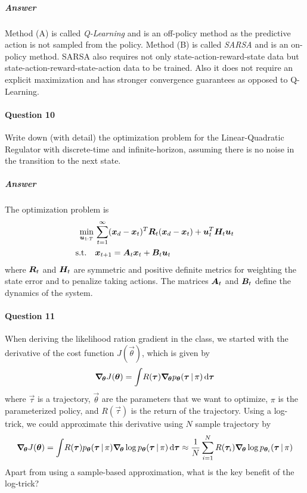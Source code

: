 		\subparagraph{Answer}
			Method (A) is called \emph{Q-Learning} and is an off-policy method as the predictive action is not sampled from the policy. Method (B) is called \emph{SARSA} and is an on-policy method. SARSA also requires not only state-action-reward-state data but state-action-reward-state-action data to be trained. Also it does not require an explicit maximization and has stronger convergence guarantees as opposed to Q-Learning.

	\paragraph{Question 10}
		Write down (with detail) the optimization problem for the Linear-Quadratic Regulator with discrete-time and infinite-horizon, assuming there is no noise in the transition to the next state.

		\subparagraph{Answer}
			The optimization problem is
			\begin{equation*}
				\begin{aligned}
					\min_{\bm{u}_{1:T}} \,& \sum_{t = 1}^{\infty} (\bm{x}_d - \bm{x}_t)^T \bm{R}_t (\bm{x}_d - \bm{x}_t) + \bm{u}_t^T \bm{H}_t \bm{u}_t \\
					\mathrm{s.t.} \quad&
						\begin{aligned}
							\bm{x}_{t + 1} &= \bm{A}_t \bm{x}_t + \bm{B}_t \bm{u}_t
						\end{aligned}
				\end{aligned}
			\end{equation*}
			where \(\bm{R}_t\) and \(\bm{H}_t\) are symmetric and positive definite metrics for weighting the state error and to penalize taking actions. The matrices \(\bm{A}_t\) and \(\bm{B}_t\) define the dynamics of the system.

	\paragraph{Question 11}
		When deriving the likelihood ration gradient in the class, we started with the derivative of the cost function \( J(\vec{\theta}) \), which is given by
		\begin{equation*}
			\grad_{\!\bm{\theta}} J(\bm{\theta}) = \int\! R(\bm{\tau}) \grad_{\!\bm{\theta}} p_{\bm{\theta}}(\bm{\tau} \,\vert\, \pi) \dd{\bm{\tau}}
		\end{equation*}
		where \(\vec{\tau}\) is a trajectory, \(\vec{\theta}\) are the parameters that we want to optimize, \(\pi\) is the parameterized policy, and \(R(\vec{\tau})\) is the return of the trajectory. Using a log-trick, we could approximate this derivative using \(N\) sample trajectory by
		\begin{equation*}
			\grad_{\!\bm{\theta}} J(\bm{\theta})
				= \int\! R(\bm{\tau}) p_{\bm{\theta}}(\bm{\tau} \,\vert\, \pi) \grad_{\!\bm{\theta}} \log p_{\bm{\theta}}(\bm{\tau} \,\vert\, \pi) \dd{\bm{\tau}}
				\approx \frac{1}{N} \sum_{i = 1}^{N} R(\bm{\tau}_i) \grad_{\!\bm{\theta}} \log p_{\bm{\theta}_i}(\bm{\tau} \,\vert\, \pi)
		\end{equation*}
		Apart from using a sample-based approximation, what is the key benefit of the log-trick?

